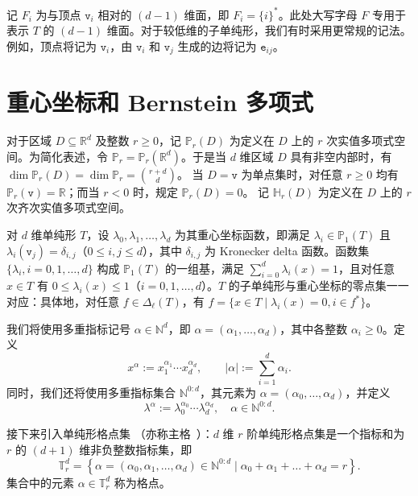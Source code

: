 记 $F_{i}$ 为与顶点 $\texttt{v}_i$ 相对的 $(d-1)$ 维面，即 $F_i = \{i\}^*$。此处大写字母 $F$ 专用于表示 $T$ 的 $(d-1)$ 维面。对于较低维的子单纯形，我们有时采用更常规的记法。例如，顶点将记为 $\texttt{v}_i$，由 $\texttt{v}_i$ 和 $\texttt{v}_j$ 生成的边将记为 $\texttt{e}_{ij}$。






\section{重心坐标和 Bernstein 多项式}
对于区域 $D \subseteq \mathbb{R}^{d}$ 及整数 $r \geqslant 0$，记 $\mathbb{P}_{r}(D)$ 为定义在 $D$ 上的 $r$ 次实值多项式空间。为简化表述，令 $\mathbb{P}_{r}=\mathbb{P}_{r}\left(\mathbb{R}^{d}\right)$。于是当 $d$ 维区域 $D$ 具有非空内部时，有 $\operatorname{dim} \mathbb{P}_{r}(D)=\operatorname{dim} \mathbb{P}_{r}=\displaystyle{r+d \choose d}$。
当 $D = {\texttt{v}}$ 为单点集时，对任意 $r \geqslant 0$ 均有 $\mathbb{P}_{r}(\texttt{v})=\mathbb{R}$；而当 $r<0$ 时，规定 $\mathbb{P}_{r}(D)= {0}$。
记 $\mathbb{H}_{r}(D)$ 为定义在 $D$ 上的 $r$ 次齐次实值多项式空间。

对 $d$ 维单纯形 $T$，设 $\lambda_{0}, \lambda_{1}, \ldots, \lambda_{d}$ 为其重心坐标函数，即满足 $\lambda_{i} \in \mathbb{P}_{1}(T)$ 且 $\lambda_{i}\left(\texttt{v}_j\right)=\delta_{i,j}$（$0 \leqslant i, j \leqslant d$），其中 $\delta_{i,j}$ 为 Kronecker delta 函数。函数集 $\{\lambda_{i}, i=0,1,\ldots, d\}$ 构成 $\mathbb{P}_{1}(T)$ 的一组基，满足 $\sum_{i=0}^d\lambda_i (x)= 1$，且对任意 $x\in T$ 有 $0\leq \lambda_i(x)\leq 1$（$i=0,1,\ldots,d$）。$T$ 的子单纯形与重心坐标的零点集一一对应：具体地，对任意 $f\in \Delta_{\ell}(T)$，有 $f = \{x\in T\mid \lambda_i(x) = 0, i\in f^*\}$。

我们将使用多重指标记号 $\alpha \in \mathbb{N}^{d}$，即 $\alpha=(\alpha_1, \dots, \alpha_d)$，其中各整数 $\alpha_i \ge 0$。定义
\[
x^\alpha := x_1^{\alpha_1} \cdots x_d^{\alpha_d}, \qquad |\alpha| := \sum_{i=1}^d \alpha_i.
\]
同时，我们还将使用多重指标集合 $\mathbb{N}^{0:d}$，其元素为 $\alpha = (\alpha_0, \dots, \alpha_d)$，并定义
\[
\lambda^\alpha := \lambda_0^{\alpha_0} \cdots \lambda_d^{\alpha_d}, \quad \alpha \in \mathbb{N}^{0:d}.
\]

接下来引入单纯形格点集 \cite{ChenHuang2024,ChenHuang2021Cmgeodecomp}（亦称主格~\cite{Nicolaides1973}）：$d$ 维 $r$ 阶单纯形格点集是一个指标和为 $r$ 的 $(d+1)$ 维非负整数指标集，即
\[
\mathbb T^{d}_r = \left \{ \alpha = (\alpha_0, \alpha_1, \ldots, \alpha_d)\in\mathbb N^{0:d} \mid \alpha_0 + \alpha_1 + \ldots + \alpha_d = r \right \}.
\]
集合中的元素 $\alpha \in \mathbb{T}^d_r$ 称为格点。

